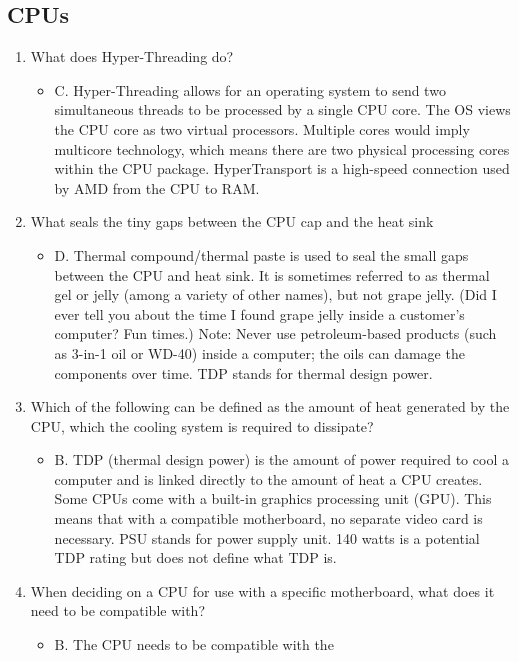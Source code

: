 \documentclass{article}
\begin{document}
\subsection{CPUs}
\begin{enumerate}
    \item What does Hyper-Threading do?
    \begin{itemize}
        \item C. Hyper-Threading allows for an operating
system to send two simultaneous threads to be
processed by a single CPU core. The OS views the
CPU core as two virtual processors. Multiple cores
would imply multicore technology, which means
there are two physical processing cores within the
CPU package. HyperTransport is a high-speed
connection used by AMD from the CPU to RAM.
    \end{itemize}
    \item What seals the tiny gaps between the CPU cap and
the heat sink
    \begin{itemize}
        \item D. Thermal compound/thermal paste is used to
seal the small gaps between the CPU and heat
sink. It is sometimes referred to as thermal gel or
jelly (among a variety of other names), but not
grape jelly. (Did I ever tell you about the time I
found grape jelly inside a customer’s computer?
Fun times.) Note: Never use petroleum-based
products (such as 3-in-1 oil or WD-40) inside a
computer; the oils can damage the components
over time. TDP stands for thermal design power.
    \end{itemize}
    \item Which of the following can be defined as the
amount of heat generated by the CPU, which the
cooling system is required to dissipate?
    \begin{itemize}
        \item B. TDP (thermal design power) is the amount of
power required to cool a computer and is linked
directly to the amount of heat a CPU creates.
Some CPUs come with a built-in graphics
processing unit (GPU). This means that with a
compatible motherboard, no separate video card
is necessary. PSU stands for power supply unit.
140 watts is a potential TDP rating but does not
define what TDP is.
    \end{itemize}
    \item When deciding on a CPU for use with a specific
motherboard, what does it need to be compatible
with?
    \begin{itemize}
        \item B. The CPU needs to be compatible with the

\end{itemize}
\end{enumerate}
\end{document}

